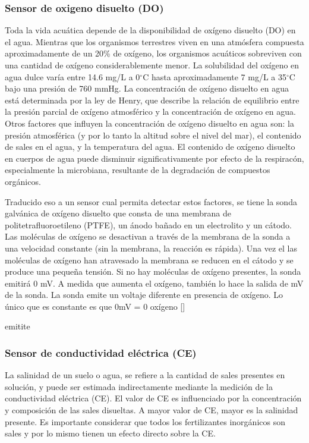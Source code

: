 \subsubsection{Sensor de oxigeno disuelto (DO)}

Toda la vida acu\'atica depende de la disponibilidad de oxígeno disuelto (DO) en el agua. Mientras que los organismos terrestres viven en una atm\'osfera compuesta aproximadamente de un 20\% de ox\'igeno, los organismos acu\'aticos sobreviven con una cantidad de ox\'igeno considerablemente menor. La solubilidad del ox\'igeno en agua dulce var\'ia entre 14.6 mg/L a 0$^{\circ}$C hasta aproximadamente 7 mg/L a 35$^{\circ}$C bajo una presi\'on de 760 mmHg. La concentraci\'on de ox\'igeno disuelto en agua est\'a determinada por la ley de Henry, que describe la relaci\'on de equilibrio entre la presi\'on parcial de ox\'igeno atmosf\'erico y la concentraci\'on de oxígeno en agua. Otros factores que influyen la concentraci\'on de ox\'igeno disuelto en agua son: la presi\'on atmosf\'erica (y por lo tanto la altitud sobre el nivel del mar), el contenido de sales en el agua, y la temperatura del agua. El contenido de ox\'igeno disuelto en cuerpos de agua puede disminuir significativamente por efecto de la respirac\'on, especialmente la microbiana, resultante de la degradaci\'on de compuestos org\'anicos. 

Traducido eso a un sensor cual permita detectar estos factores, se tiene la sonda galv\'anica de ox\'igeno disuelto que consta de una membrana de politetrafluoroetileno (PTFE), un \'anodo ba\~nado en un electrolito y un c\'atodo. Las mol\'eculas de ox\'igeno se desactivan a trav\'es de la membrana de la sonda a una velocidad constante (sin la membrana, la reacción es r\'apida). Una vez el las mol\'eculas de ox\'igeno han atravesado la membrana se reducen en el c\'atodo y se produce una peque\~na tensi\'on. Si no hay mol\'eculas de ox\'igeno presentes, la sonda emitir\'a 0 mV. A medida que aumenta el ox\'igeno, tambi\'en lo hace la salida de mV de la sonda. La sonda emite un voltaje diferente en presencia de ox\'igeno. Lo \'unico que es constante es que 0mV = 0 ox\'igeno []

emitite
\subsubsection{Sensor de conductividad eléctrica (CE) }
La salinidad de un suelo o agua, se refiere a la cantidad de sales presentes en solución, y puede ser estimada indirectamente mediante la medición de la conductividad eléctrica (CE). El valor de CE es influenciado por la concentración y composición de las sales disueltas. A mayor valor de CE, mayor es la salinidad presente. Es importante considerar que todos los fertilizantes inorgánicos son sales y por lo mismo tienen un efecto directo sobre la CE.

